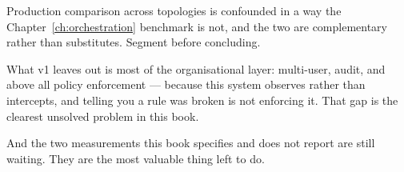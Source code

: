 Production comparison across topologies is confounded in a way the
Chapter~\ref{ch:orchestration} benchmark is not, and the two are complementary
rather than substitutes. Segment before concluding.

What v1 leaves out is most of the organisational layer: multi-user, audit, and
above all policy enforcement --- because this system observes rather than
intercepts, and telling you a rule was broken is not enforcing it. That gap is
the clearest unsolved problem in this book.

And the two measurements this book specifies and does not report are still
waiting. They are the most valuable thing left to do.
